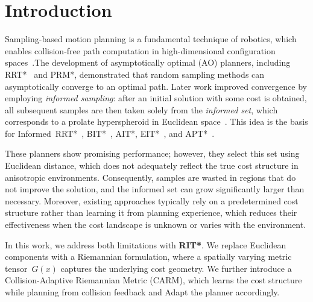 \documentclass[journal]{IEEEtran}
\begin{document}
\section{Introduction}\label{sec:intro}
Sampling-based motion planning is a fundamental technique of robotics, which
enables collision-free path computation in high-dimensional configuration
spaces~\cite{LaValle2006}.The development of asymptotically optimal (AO) planners, including RRT*~\cite{Karaman2011} and PRM*, demonstrated that random sampling methods can asymptotically converge to an optimal path. Later work improved convergence by employing \emph{informed sampling}: after an initial solution with some cost is obtained, all subsequent samples are then taken solely from the \emph{informed set}, which corresponds to a prolate hyperspheroid in Euclidean space~\cite{Gammell2018}. This idea is the basis for Informed~RRT*~\cite{Gammell2018}, BIT*~\cite{Gammell2020}, AIT*, EIT*~\cite{Strub2022}, and APT*~\cite{APT2025}. 

These planners show promising performance; however, they select this set using Euclidean distance, which does not adequately reflect the true cost structure in anisotropic environments.
Consequently, samples are wasted in regions that do not improve the solution, and the informed set can grow significantly larger than necessary.
Moreover, existing approaches typically rely on a predetermined cost structure rather than learning it from planning experience, which reduces their effectiveness when the cost landscape is unknown or varies with the environment.

In this work, we address both limitations with \textbf{RIT*}. We replace
Euclidean components with a Riemannian formulation, where a spatially
varying metric tensor~$G(x)$ captures the underlying cost geometry.
We further introduce a Collision-Adaptive Riemannian Metric (CARM),
which learns the cost structure while planning from collision feedback and
Adapt the planner accordingly.
\end{document}
